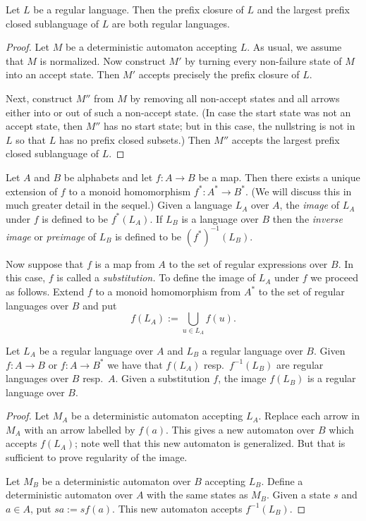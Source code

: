 \begin{thm}[prefixes] Let $L$ be a regular language. Then the prefix
    closure of $L$ and the largest prefix closed sublanguage of $L$
    are both regular languages.
\end{thm}
\begin{proof} Let $M$ be a deterministic automaton accepting $L$. As
    usual, we assume that $M$ is normalized. Now construct $M'$ by
    turning every non-failure state of $M$ into an accept state. Then
    $M'$ accepts precisely the prefix closure of $L$.

    Next, construct $M''$ from $M$ by removing all non-accept states
    and all arrows either into or out of such a non-accept state. (In
    case the start state was not an accept state, then $M''$ has no
    start state; but in this case, the nullstring is not in $L$ so
    that $L$ has no prefix closed subsets.) Then $M''$ accepts the
    largest prefix closed sublanguage of $L$.
\end{proof}

\begin{defns} Let $A$ and $B$ be alphabets and let $f: A\rightarrow B$
    be a map. Then there exists a unique extension of $f$ to a monoid
    homomorphism $f^*: A^*\rightarrow B^*$. (We will discuss this in
    much greater detail in the sequel.) Given a language $L_A$
    over $A$, the \emph{image} of $L_A$ under $f$ is defined to be
    $f^*(L_A)$. If $L_B$ is a language over $B$ then the \emph{inverse
    image} or \emph{preimage} of $L_B$ is defined to be
    $(f^*)^{-1}(L_B)$.

    Now suppose that $f$ is a map from $A$ to the set of regular
    expressions over $B$. In this case, $f$ is called a
    \emph{substitution.} To define the image of $L_A$ under $f$ we
    proceed as follows. Extend $f$ to a monoid homomorphism from $A^*$
    to the set of regular languages over $B$ and put \[f(L_A) :=
    \bigcup_{u\in L_A} f(u).\]
\end{defns}

\begin{lem} Let $L_A$ be a regular language over $A$ and $L_B$ a
    regular language over $B$. Given $f : A \rightarrow B$ or $f:
    A\rightarrow B^*$ we have that \(f(L_A)\) resp.~\(f^{-1}(L_B)\) are
    regular languages over $B$ resp.~$A$. Given a substitution $f$,
    the image $f(L_B)$ is a regular language over $B$.
\end{lem}
\begin{proof} Let $M_A$ be a deterministic automaton accepting $L_A$.
    Replace each arrow in $M_A$ with an arrow labelled by $f(a)$. This
    gives a new automaton over $B$ which accepts $f(L_A)$; note well
    that this new automaton is generalized.  But that is sufficient to
    prove regularity of the image.

    Let $M_B$ be a deterministic automaton over $B$ accepting $L_B$.
    Define a deterministic automaton over $A$ with the same states as
    $M_B$. Given a state $s$ and $a\in A$, put $sa := sf(a)$. This new
    automaton accepts $f^{-1}(L_B)$.
\end{proof}

